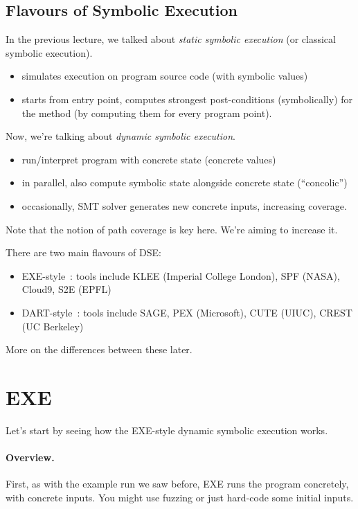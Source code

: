 \documentclass[11pt]{article}
\begin{document}
\subsection*{Flavours of Symbolic Execution}
In the previous lecture, we talked about \emph{static symbolic execution} (or classical symbolic execution).
\begin{itemize}[noitemsep]
\item simulates execution on program source code (with symbolic values)
\item starts from entry point, computes strongest post-conditions (symbolically) for the method (by computing them for every program point).
\end{itemize}
Now, we're talking about \emph{dynamic symbolic execution}.
\begin{itemize}[noitemsep]
    \item run/interpret program with concrete state (concrete values)
    \item in parallel, also compute symbolic state alongside concrete state (``concolic'')
    \item occasionally, SMT solver generates new concrete inputs, increasing coverage.
\end{itemize}
Note that the notion of path coverage is key here. We're aiming to increase it.

There are two main flavours of DSE:
\begin{itemize}[noitemsep]
\item EXE-style~\cite{cadar06:_exe}: tools include KLEE (Imperial College London), SPF (NASA), Cloud9, S2E (EPFL)
  \item DART-style~\cite{godefroid05:_dart}: tools include SAGE, PEX (Microsoft), CUTE (UIUC), CREST (UC Berkeley)
\end{itemize}
More on the differences between these later.

\section{EXE}
Let's start by seeing how the EXE-style dynamic symbolic execution works.

\paragraph{Overview.} First, as with the example run we saw before, EXE runs the program concretely, with concrete inputs. You might use fuzzing
or just hard-code some initial inputs.
\end{document}
